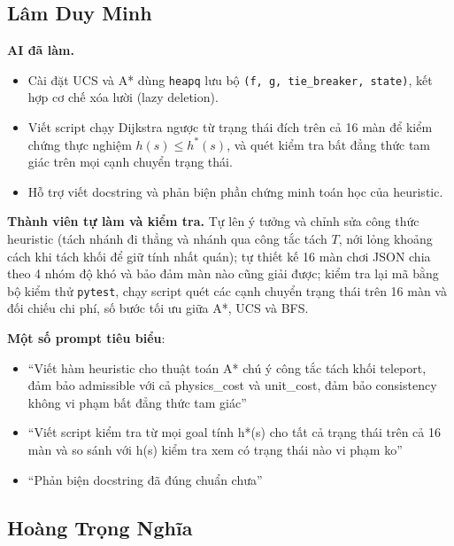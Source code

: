 \subsection*{Lâm Duy Minh}

\textbf{AI đã làm.}
\begin{itemize}
\item Cài đặt UCS và A* dùng \texttt{heapq} lưu bộ \texttt{(f, g, tie\_breaker, state)}, kết hợp cơ chế xóa lười (lazy deletion).
\item Viết script chạy Dijkstra ngược từ trạng thái đích trên cả 16 màn để kiểm chứng thực nghiệm $h(s) \le h^*(s)$, và quét kiểm tra bất đẳng thức tam giác trên mọi cạnh chuyển trạng thái.
\item Hỗ trợ viết docstring và phản biện phần chứng minh toán học của heuristic.
\end{itemize}

\textbf{Thành viên tự làm và kiểm tra.} Tự lên ý tưởng và chỉnh sửa công thức heuristic (tách nhánh đi thẳng và nhánh qua công tắc tách $T$, nới lỏng khoảng cách khi tách khối để giữ tính nhất quán); tự thiết kế 16 màn chơi JSON chia theo 4 nhóm độ khó và bảo đảm màn nào cũng giải được; kiểm tra lại mã bằng bộ kiểm thử \texttt{pytest}, chạy script quét các cạnh chuyển trạng thái trên 16 màn và đối chiếu chi phí, số bước tối ưu giữa A*, UCS và BFS.

\textbf{Một số prompt tiêu biểu}:
\begin{itemize}
\item ``Viết hàm heuristic cho thuật toán A* chú ý công tắc tách khối teleport, đảm bảo admissible với cả physics\_cost và unit\_cost, đảm bảo consistency không vi phạm bất đẳng thức tam giác''
\item ``Viết script kiểm tra từ mọi goal tính h*(s) cho tất cả trạng thái trên cả 16 màn và so sánh với h(s) kiểm tra xem có trạng thái nào vi phạm ko''
\item ``Phản biện docstring đã đúng chuẩn chưa''
\end{itemize}

\subsection*{Hoàng Trọng Nghĩa}

